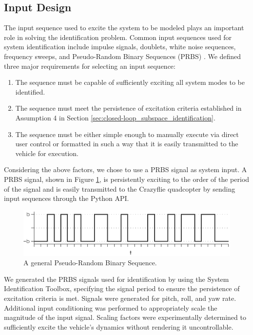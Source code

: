 \subsection{Input Design}
The input sequence used to excite the system to be modeled plays an important role in solving the identification problem. Common input sequences used for system identification include impulse signals, doublets, white noise sequences, frequency sweeps, and Pseudo-Random Binary Sequences (PRBS) \cite{verhaegen2007filtering}. We defined three major requirements for selecting an input sequence:
\begin{enumerate}
\item The sequence must be capable of sufficiently exciting all system modes to be identified.
\item The sequence must meet the persistence of excitation criteria established in Assumption 4 in Section \ref{sec:closed-loop_subspace_identification}.
\item The sequence must be either simple enough to manually execute via direct user control or formatted in such a way that it is easily transmitted to the vehicle for execution.  
\end{enumerate}
Considering the above factors, we chose to use a PRBS signal as system input. A PRBS signal, shown in Figure \ref{fig:general_prbs}, is persistently exciting to the order of the period of the signal \cite{wilson2005understanding} and is easily transmitted to the Crazyflie quadcopter by sending input sequences through the Python API.
\begin{figure}[htb!]
	\centering
	\includegraphics{../fig/general_prbs.eps}
	\caption{A general Pseudo-Random Binary Sequence.}
	\label{fig:general_prbs}
\end{figure}

We generated the PRBS signals used for identification by using the \matlab System Identification Toolbox, specifying the signal period to ensure the persistence of excitation criteria is met. Signals were generated for pitch, roll, and yaw rate. Additional input conditioning was performed to appropriately scale the magnitude of the input signal. Scaling factors were experimentally determined to sufficiently excite the vehicle's dynamics without rendering it uncontrollable.

